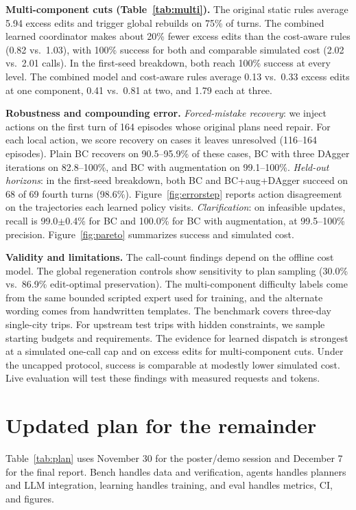 \documentclass{article}
\begin{document}
\textbf{Multi-component cuts (Table~\ref{tab:multi}).} The original
static rules average 5.94 excess edits and trigger global rebuilds on
75\% of turns. The combined learned coordinator makes about 20\% fewer
excess edits than the cost-aware rules (0.82 vs.\ 1.03), with 100\%
success for both and comparable simulated cost (2.02 vs.\ 2.01 calls).
In the first-seed breakdown, both reach 100\% success at every level.
The combined model and cost-aware rules average 0.13 vs.\ 0.33 excess
edits at one component, 0.41 vs.\ 0.81 at two, and 1.79 each at three.

\textbf{Robustness and compounding error.}
\emph{Forced-mistake recovery}: we inject actions on the first turn of
164 episodes whose original plans need repair. For each local action,
we score recovery on cases it leaves unresolved (116--164 episodes).
Plain BC recovers on 90.5--95.9\% of these cases, BC with three DAgger
iterations on 82.8--100\%, and BC with augmentation on 99.1--100\%.
\emph{Held-out horizons}: in the first-seed breakdown, both BC and
BC+aug+DAgger succeed on 68 of 69 fourth turns (98.6\%). Figure~\ref{fig:errorstep}
reports action disagreement on the trajectories each learned policy visits.
\emph{Clarification}: on infeasible updates, recall is 99.0$\pm$0.4\% for BC
and 100.0\% for BC with augmentation, at 99.5--100\% precision.
Figure~\ref{fig:pareto} summarizes success and simulated cost.

\textbf{Validity and limitations.} The call-count findings depend on the
offline cost model. The global regeneration controls show sensitivity to
plan sampling (30.0\% vs.\ 86.9\% edit-optimal preservation). The
multi-component difficulty labels come from the same bounded scripted
expert used for training, and the alternate wording comes from
handwritten templates. The benchmark covers three-day single-city trips.
For upstream test trips with hidden constraints, we sample starting
budgets and requirements. The evidence for learned dispatch is strongest
at a simulated one-call cap and on excess edits for multi-component cuts.
Under the uncapped protocol, success is comparable at modestly lower
simulated cost. Live evaluation will test these findings with measured
requests and tokens.

\section{Updated plan for the remainder}
\label{sec:plan}

Table~\ref{tab:plan} uses November 30 for the poster/demo session and
December 7 for the final report. Bench handles data and verification,
agents handles planners and LLM integration, learning handles training,
and eval handles metrics, CI, and figures.
\end{document}
